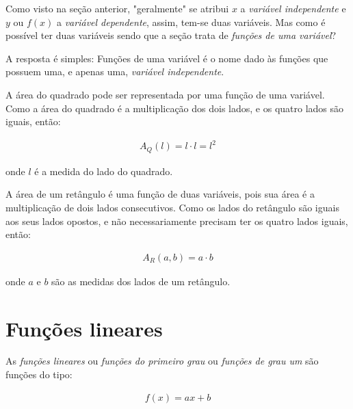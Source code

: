 Como visto na seção anterior, "geralmente" se atribui $x$ a \textit{variável independente} e $y$ ou $f(x)$ a \textit{variável dependente}, assim, tem-se duas variáveis. Mas como é possível ter duas variáveis sendo que a seção trata de \textit{funções de uma variável}?

A resposta é simples: Funções de uma variável é o nome dado às funções que possuem uma, e apenas uma, \textit{variável independente}.

\begin{example}
	A área do quadrado pode ser representada por uma função de uma variável. Como a área do quadrado é a multiplicação dos dois lados, e os quatro lados são iguais, então:
	
	\begin{ceqn}
		\begin{align*}
		A_Q(l)=l \cdot l = l^2
		\end{align*}
	\end{ceqn}

onde $l$ é a medida do lado do quadrado.
\end{example}

\begin{example}
	A área de um retângulo é uma função de duas variáveis, pois sua área é a multiplicação de dois lados consecutivos. Como os lados do retângulo são iguais aos seus lados opostos, e não necessariamente precisam ter os quatro lados iguais, então:
	
	\begin{ceqn}
		\begin{align*}
		A_R(a,b)=a \cdot b
		\end{align*}
	\end{ceqn}

onde $a$ e $b$ são as medidas dos lados de um retângulo.
\end{example}

\vspace{.5cm}


\section{Funções lineares}


As \textit{funções lineares} ou \textit{funções do primeiro grau} ou \textit{funções de grau um} são funções do tipo:

\begin{ceqn}
	\begin{align*}
	f(x) = ax +b
	\end{align*}
\end{ceqn}

